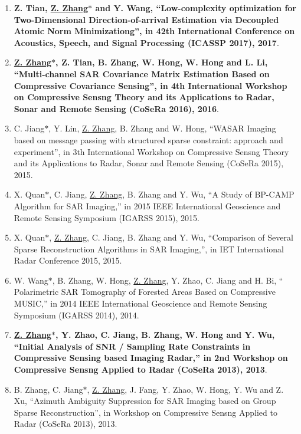 \documentclass[paper=a4,fontsize=11pt]{scrartcl}
\begin{document}
\begin{enumerate}
	\item \textbf{Z. Tian, \underline{Z. Zhang$\ast$} and Y. Wang, ``Low-complexity optimization for Two-Dimensional Direction-of-arrival Estimation via Decoupled Atomic Norm Minimizationg'', in 42th International Conference on Acoustics, Speech, and Signal Processing (ICASSP 2017), 2017}.
	
	\item \textbf{\underline{Z. Zhang$\ast$}, Z. Tian, B. Zhang, W. Hong, W. Hong and L. Li, ``Multi-channel SAR Covariance Matrix Estimation Based on Compressive Covariance Sensing'', in 4th International Workshop on Compressive Sensng Theory and its Applications to Radar, Sonar and Remote Sensing (CoSeRa 2016), 2016}.
	
	\item C. Jiang$\ast$, Y. Lin, \underline{Z. Zhang}, B. Zhang and W. Hong, ``WASAR Imaging based on message passing with structured sparse constraint: approach and experiment'', in 3th International Workshop on Compressive Sensng Theory and its Applications to Radar, Sonar and Remote Sensing (CoSeRa 2015), 2015.
	
	\item X. Quan$\ast$, C. Jiang, \underline{Z. Zhang}, B. Zhang and Y. Wu, ``A Study of BP-CAMP Algorithm for SAR Imaging,'' in 2015 IEEE International Geoscience and Remote Sensing Symposium (IGARSS 2015), 2015.
	
	\item X. Quan$\ast$, \underline{Z. Zhang}, C. Jiang, B. Zhang and Y. Wu, ``Comparison of Several Sparse Reconstruction Algorithms in SAR Imaging,'', in IET International Radar Conference 2015, 2015.
	
	\item W. Wang$\ast$, B. Zhang, W. Hong, \underline{Z. Zhang}, Y. Zhao, C. Jiang and H. Bi, `` Polarimetric SAR Tomography of Forested Areas Based on Compressive MUSIC,'' in 2014 IEEE International Geoscience and Remote Sensing Symposium (IGARSS 2014), 2014.
	
	\item \textbf{\underline{Z. Zhang$\ast$}, Y. Zhao, C. Jiang, B. Zhang, W. Hong and Y. Wu, ``Initial Analysis of SNR / Sampling Rate Constraints in Compressive Sensing based Imaging Radar,'' in 2nd Workshop on Compressive Sensng Applied to Radar (CoSeRa 2013), 2013}.
	
	\item B. Zhang, C. Jiang$\ast$, \underline{Z. Zhang}, J. Fang, Y. Zhao, W. Hong, Y. Wu and Z. Xu, ``Azimuth Ambiguity Suppression for SAR Imaging based on Group Sparse Reconstruction'', in Workshop on Compressive Sensng Applied to Radar (CoSeRa 2013), 2013.
	

\end{enumerate}
\end{document}
